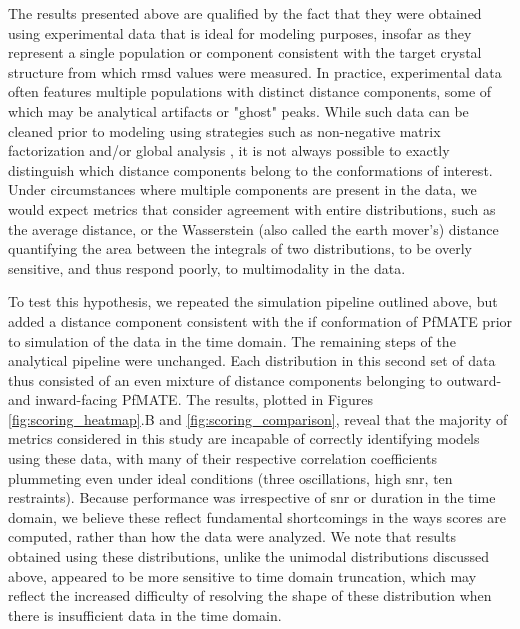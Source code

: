 The results presented above are qualified by the fact that they were obtained using experimental data that is ideal for modeling purposes, insofar as they represent a single population or component consistent with the target crystal structure from which \gls{rmsd} values were measured. In practice, experimental data often features multiple populations with distinct distance components, some of which may be analytical artifacts or "ghost" peaks. While such data can be cleaned prior to modeling using strategies such as non-negative matrix factorization and/or global analysis \citep*{Hustedt2018, Wingler2019}, it is not always possible to exactly distinguish which distance components belong to the conformations of interest. Under circumstances where multiple components are present in the data, we would expect metrics that consider agreement with entire distributions, such as the average distance, or the Wasserstein (also called the earth mover's) distance quantifying the area between the integrals of two distributions, to be overly sensitive, and thus respond poorly, to multimodality in the data.

To test this hypothesis, we repeated the simulation pipeline outlined above, but added a distance component consistent with the \gls{if} conformation of PfMATE prior to simulation of the data in the time domain. The remaining steps of the analytical pipeline were unchanged. Each distribution in this second set of data thus consisted of an even mixture of distance components belonging to outward- and inward-facing PfMATE. The results, plotted in Figures \ref{fig:scoring_heatmap}.B and \ref{fig:scoring_comparison}, reveal that the majority of metrics considered in this study are incapable of correctly identifying models using these data, with many of their respective correlation coefficients plummeting even under ideal conditions (three oscillations, high \gls{snr}, ten restraints). Because performance was irrespective of \gls{snr} or duration in the time domain, we believe these reflect fundamental shortcomings in the ways scores are computed, rather than how the data were analyzed. We note that results obtained using these distributions, unlike the unimodal distributions discussed above, appeared to be more sensitive to time domain truncation, which may reflect the increased difficulty of resolving the shape of these distribution when there is insufficient data in the time domain.

